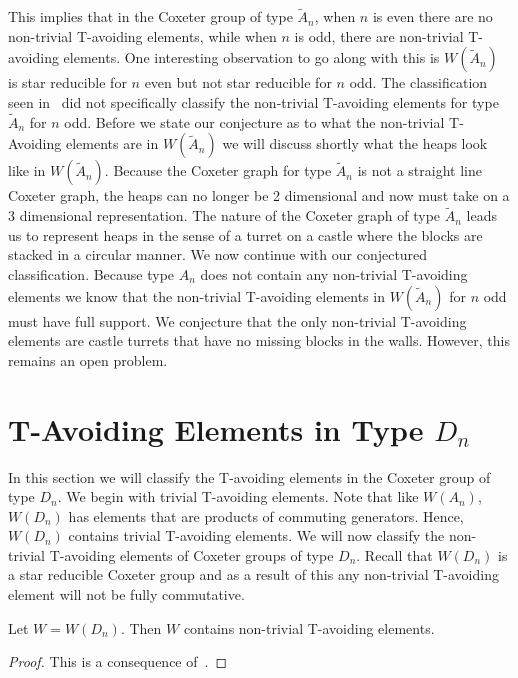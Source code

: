 This implies that in the Coxeter group of type $\widetilde{A}_n$, when $n$ is even there are no non-trivial T-avoiding elements, while when $n$ is odd, there are non-trivial T-avoiding elements. One interesting observation to go along with this is $W(\widetilde{A}_n)$ is star reducible for $n$ even but not star reducible for $n$ odd. The classification seen in~\cite{Fan1999} did not specifically classify the non-trivial T-avoiding elements for type $\widetilde{A}_n$ for $n$ odd. Before we state our conjecture as to what the non-trivial T-Avoiding elements are in $W(\widetilde{A}_n)$ we will discuss shortly what the heaps look like in $W(\widetilde{A}_n)$. Because the Coxeter graph for type $\widetilde{A}_n$ is not a straight line Coxeter graph, the heaps can no longer be 2 dimensional and now must take on a 3 dimensional representation. The nature of the Coxeter graph of type $\widetilde{A}_n$ leads us to represent heaps in the sense of a turret on a castle where the blocks are stacked in a circular manner. We now continue with our conjectured classification. Because type $A_n$ does not contain any non-trivial T-avoiding elements we know that the non-trivial T-avoiding elements in $W(\widetilde{A}_n)$ for $n$ odd must have full support. We conjecture that the only non-trivial T-avoiding elements are castle turrets that have no missing blocks in the walls. However, this remains an open problem.


\section{T-Avoiding Elements in Type $D_n$}

In this section we will classify the T-avoiding elements in the Coxeter group of type $D_n$. We begin with trivial T-avoiding elements. Note that like $W(A_n)$, $W(D_n)$ has elements that are products of commuting generators. Hence, $W(D_n)$ contains trivial T-avoiding elements. We will now classify the non-trivial T-avoiding elements of Coxeter groups of type $D_n$. Recall that $W(D_n)$ is a star reducible Coxeter group and as a result of this any non-trivial T-avoiding element will not be fully commutative.

\begin{theorem}
Let $W=W(D_n)$. Then $W$ contains non-trivial T-avoiding elements.
\begin{proof}
	This is a consequence of~\cite[Section 2.2]{Gern2013a}.
\end{proof}
\end{theorem}

